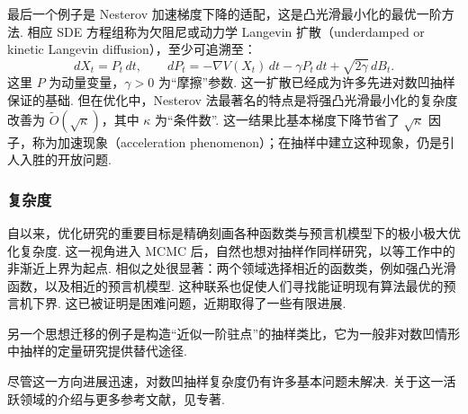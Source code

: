 最后一个例子是 Nesterov 加速梯度下降\cite{ref235}的适配，这是凸光滑最小化的最优一阶方法. 相应 SDE 方程组称为欠阻尼或动力学 Langevin 扩散（underdamped or kinetic Langevin diffusion），至少可追溯至\cite{ref179}：
$$
dX_t=P_t\,dt,\qquad
dP_t=-\nabla V(X_t)\,dt-\gamma P_t\,dt+\sqrt{2\gamma}\,dB_t.
$$
这里 $P$ 为动量变量，$\gamma>0$ 为“摩擦”参数. 这一扩散已经成为许多先进对数凹抽样保证的基础. 但在优化中，Nesterov 法最著名的特点是将强凸光滑最小化的复杂度改善为 $\widetilde O(\sqrt\kappa)$，其中 $\kappa$ 为“条件数”. 这一结果比基本梯度下降节省了 $\sqrt\kappa$ 因子，称为加速现象（acceleration phenomenon）；在抽样中建立这种现象，仍是引人入胜的开放问题.

\subsubsection*{复杂度}
自\cite{ref234}以来，优化研究的重要目标是精确刻画各种函数类与预言机模型下的极小极大优化复杂度. 这一视角进入 MCMC 后，自然也想对抽样作同样研究，以\cite{ref74,ref99,ref126,ref127}等工作中的非渐近上界为起点. 相似之处很显著：两个领域选择相近的函数类，例如强凸光滑函数，以及相近的预言机模型. 这种联系也促使人们寻找能证明现有算法最优的预言机下界. 这已被证明是困难问题，近期取得了一些有限进展.

另一个思想迁移的例子是构造“近似一阶驻点”的抽样类比，它为一般非对数凹情形中抽样的定量研究提供替代途径\cite{ref31}.

尽管这一方向进展迅速，对数凹抽样复杂度仍有许多基本问题未解决. 关于这一活跃领域的介绍与更多参考文献，见专著\cite{ref77}.
